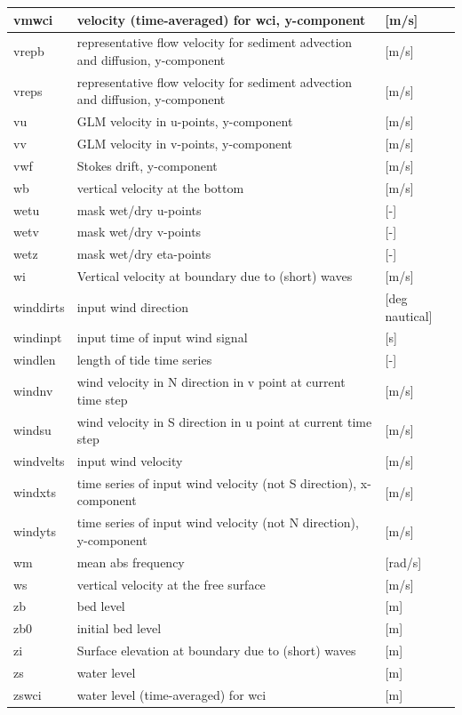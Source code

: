 \documentclass{article}
\begin{document}
\begin{tabular}{|p{0.7in}|p{2.5in}|p{0.9in}|}
vmwci & velocity (time-averaged) for wci, y-component            & [m/s] \\ \hline 
vrepb & representative flow velocity for sediment advection and diffusion, y-component        & [m/s] \\ \hline 
vreps & representative flow velocity for sediment advection and diffusion, y-component        & [m/s] \\ \hline 
vu & GLM velocity in u-points, y-component            & [m/s] \\ \hline 
vv & GLM velocity in v-points, y-component            & [m/s] \\ \hline 
vwf & Stokes drift, y-component              & [m/s] \\ \hline 
wb & vertical velocity at the bottom            & [m/s] \\ \hline 
wetu & mask wet/dry u-points              & [-] \\ \hline 
wetv & mask wet/dry v-points              & [-] \\ \hline 
wetz & mask wet/dry eta-points              & [-] \\ \hline 
wi & Vertical velocity at boundary due to (short) waves         & [m/s] \\ \hline 
winddirts & input wind direction            & [deg nautical] \\ \hline 
windinpt & input time of input wind signal          & [s] \\ \hline 
windlen & length of tide time series            & [-] \\ \hline 
windnv & wind velocity in N direction in v point at current time step     & [m/s] \\ \hline 
windsu & wind velocity in S direction in u point at current time step     & [m/s] \\ \hline 
windvelts & input wind velocity             & [m/s] \\ \hline 
windxts & time series of input wind velocity (not S direction), x-component      & [m/s] \\ \hline 
windyts & time series of input wind velocity (not N direction), y-component      & [m/s] \\ \hline 
wm & mean abs frequency              & [rad/s] \\ \hline 
ws & vertical velocity at the free surface           & [m/s] \\ \hline 
zb & bed level               & [m] \\ \hline 
zb0 & initial bed level              & [m] \\ \hline 
zi & Surface elevation at boundary due to (short) waves         & [m] \\ \hline 
zs & water level               & [m] \\ \hline 
zswci & water level (time-averaged) for wci             & [m] \\ \hline 
\end{tabular}
\end{document}

